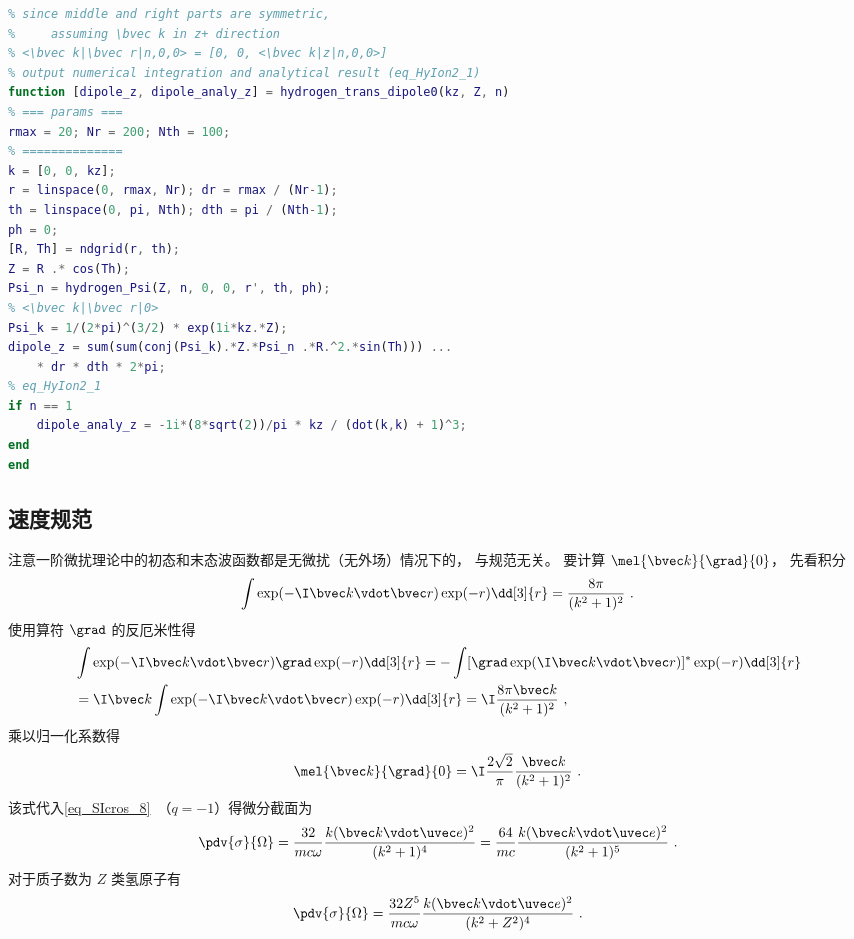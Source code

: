 \begin{lstlisting}[language=matlab, caption=hydrogen\_trans\_dipole0.m]
% hydrogen transition dipole, approximate Coulomb plane wave with plane wave
% since middle and right parts are symmetric,
%     assuming \bvec k in z+ direction
% <\bvec k|\bvec r|n,0,0> = [0, 0, <\bvec k|z|n,0,0>]
% output numerical integration and analytical result (eq_HyIon2_1)
function [dipole_z, dipole_analy_z] = hydrogen_trans_dipole0(kz, Z, n)
% === params ===
rmax = 20; Nr = 200; Nth = 100;
% ==============
k = [0, 0, kz];
r = linspace(0, rmax, Nr); dr = rmax / (Nr-1);
th = linspace(0, pi, Nth); dth = pi / (Nth-1);
ph = 0;
[R, Th] = ndgrid(r, th);
Z = R .* cos(Th);
Psi_n = hydrogen_Psi(Z, n, 0, 0, r', th, ph);
% <\bvec k|\bvec r|0>
Psi_k = 1/(2*pi)^(3/2) * exp(1i*kz.*Z);
dipole_z = sum(sum(conj(Psi_k).*Z.*Psi_n .*R.^2.*sin(Th))) ...
    * dr * dth * 2*pi;
% eq_HyIon2_1
if n == 1
    dipole_analy_z = -1i*(8*sqrt(2))/pi * kz / (dot(k,k) + 1)^3;
end
end
\end{lstlisting}


\subsection{速度规范}
注意一阶微扰理论中的初态和末态波函数都是无微扰（无外场）情况下的， 与规范无关。 要计算 $\mel{\bvec k}{\grad}{0}$， 先看积分
\begin{equation}
\int \exp(-\I \bvec k \vdot \bvec r) \exp(-r) \dd[3]{r} = \frac{8\pi }{(k^2 + 1)^2}~.
\end{equation}
使用算符 $\grad$ 的反厄米性得
\begin{equation}
\begin{aligned}
&\int \exp(-\I \bvec k \vdot \bvec r) \grad \exp(-r) \dd[3]{r}
= -\int [\grad \exp(\I \bvec k \vdot \bvec r)]^* \exp(-r) \dd[3]{r}\\
&= \I \bvec k \int \exp(-\I \bvec k \vdot \bvec r) \exp(-r) \dd[3]{r}
= \I \frac{8 \pi  \bvec k}{(k^2 + 1)^2}~,
\end{aligned}
\end{equation}
乘以归一化系数得
\begin{equation}\label{eq_HyIon2_2}
\mel{\bvec k}{\grad}{0} = \I\frac{2\sqrt{2}}{\pi}\frac{\bvec k}{(k^2 + 1)^2}~.
\end{equation}
该式代入\autoref{eq_SIcros_8}~（$q = -1$）得微分截面为
\begin{equation}
\pdv{\sigma}{\Omega} = \frac{32}{mc\omega} \frac{k(\bvec k \vdot \uvec e)^2}{(k^2 + 1)^4}
= \frac{64}{mc} \frac{k(\bvec k \vdot \uvec e)^2}{(k^2 + 1)^5}~.
\end{equation}
对于质子数为 $Z$ 类氢原子有
\begin{equation}
\pdv{\sigma}{\Omega} = \frac{32 Z^5}{mc\omega} \frac{k(\bvec k \vdot \uvec e)^2}{(k^2 + Z^2)^4}~.
\end{equation}

